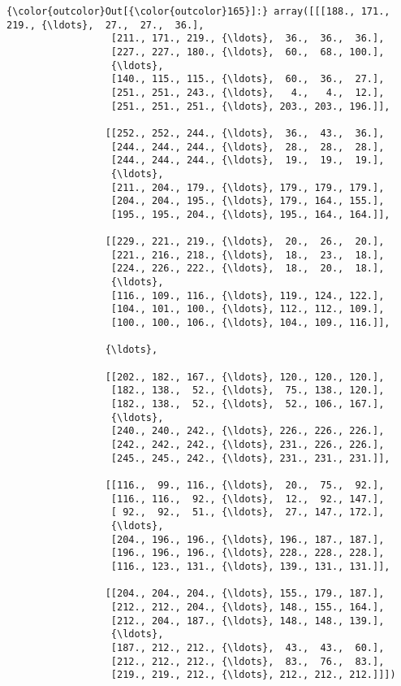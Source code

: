 \documentclass[11pt]{article}
\begin{document}
\begin{Verbatim}[commandchars=\\\{\}]
{\color{outcolor}Out[{\color{outcolor}165}]:} array([[[188., 171., 219., {\ldots},  27.,  27.,  36.],
                  [211., 171., 219., {\ldots},  36.,  36.,  36.],
                  [227., 227., 180., {\ldots},  60.,  68., 100.],
                  {\ldots},
                  [140., 115., 115., {\ldots},  60.,  36.,  27.],
                  [251., 251., 243., {\ldots},   4.,   4.,  12.],
                  [251., 251., 251., {\ldots}, 203., 203., 196.]],
          
                 [[252., 252., 244., {\ldots},  36.,  43.,  36.],
                  [244., 244., 244., {\ldots},  28.,  28.,  28.],
                  [244., 244., 244., {\ldots},  19.,  19.,  19.],
                  {\ldots},
                  [211., 204., 179., {\ldots}, 179., 179., 179.],
                  [204., 204., 195., {\ldots}, 179., 164., 155.],
                  [195., 195., 204., {\ldots}, 195., 164., 164.]],
          
                 [[229., 221., 219., {\ldots},  20.,  26.,  20.],
                  [221., 216., 218., {\ldots},  18.,  23.,  18.],
                  [224., 226., 222., {\ldots},  18.,  20.,  18.],
                  {\ldots},
                  [116., 109., 116., {\ldots}, 119., 124., 122.],
                  [104., 101., 100., {\ldots}, 112., 112., 109.],
                  [100., 100., 106., {\ldots}, 104., 109., 116.]],
          
                 {\ldots},
          
                 [[202., 182., 167., {\ldots}, 120., 120., 120.],
                  [182., 138.,  52., {\ldots},  75., 138., 120.],
                  [182., 138.,  52., {\ldots},  52., 106., 167.],
                  {\ldots},
                  [240., 240., 242., {\ldots}, 226., 226., 226.],
                  [242., 242., 242., {\ldots}, 231., 226., 226.],
                  [245., 245., 242., {\ldots}, 231., 231., 231.]],
          
                 [[116.,  99., 116., {\ldots},  20.,  75.,  92.],
                  [116., 116.,  92., {\ldots},  12.,  92., 147.],
                  [ 92.,  92.,  51., {\ldots},  27., 147., 172.],
                  {\ldots},
                  [204., 196., 196., {\ldots}, 196., 187., 187.],
                  [196., 196., 196., {\ldots}, 228., 228., 228.],
                  [116., 123., 131., {\ldots}, 139., 131., 131.]],
          
                 [[204., 204., 204., {\ldots}, 155., 179., 187.],
                  [212., 212., 204., {\ldots}, 148., 155., 164.],
                  [212., 204., 187., {\ldots}, 148., 148., 139.],
                  {\ldots},
                  [187., 212., 212., {\ldots},  43.,  43.,  60.],
                  [212., 212., 212., {\ldots},  83.,  76.,  83.],
                  [219., 219., 212., {\ldots}, 212., 212., 212.]]])
\end{Verbatim}
            
\end{document}
